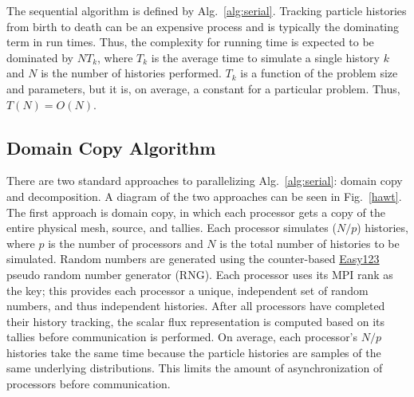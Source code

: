 \documentclass[12pt]{article}
\begin{document}
The sequential algorithm is defined by Alg.~\ref{alg:serial}.  Tracking particle
histories from birth to death can be an expensive process and is typically the dominating term in run
times.  Thus, the complexity for running time is expected to be dominated by $N
T_k$, where $T_k$ is the average time to simulate a single history $k$ and $N$ is the
number of histories performed.  $T_k$ is
a function of the problem size and parameters, but it is, on average, a constant for a
particular problem.  Thus, $T(N) = O(N)$.

\subsection{Domain Copy Algorithm}

There are two standard approaches to parallelizing Alg.~\ref{alg:serial}: domain
copy and decomposition.   A diagram of the two approaches can
be seen in Fig.~\ref{hawt}.  The first approach
is domain copy, in which each processor gets a copy of the entire physical mesh,
source, and tallies. Each processor simulates ($N/p$) histories, where $p$ is the
number of processors and $N$ is the total number of histories to be simulated. Random
numbers are generated using the counter-based
\href{http://www.thesalmons.org/john/random123/papers/random123sc11.pdf}{Easy123}
pseudo random number generator (RNG).  Each processor uses its MPI rank as the key;
this provides each processor a unique, independent set of random numbers, and thus
independent histories.  After all processors have completed their history tracking,
the scalar flux representation is computed based on its tallies before communication
is performed.  On average, each processor's $N/p$ histories take the same time
because the particle histories are samples of the same
underlying distributions. This limits the amount of asynchronization of processors
before communication.  
\end{document}

